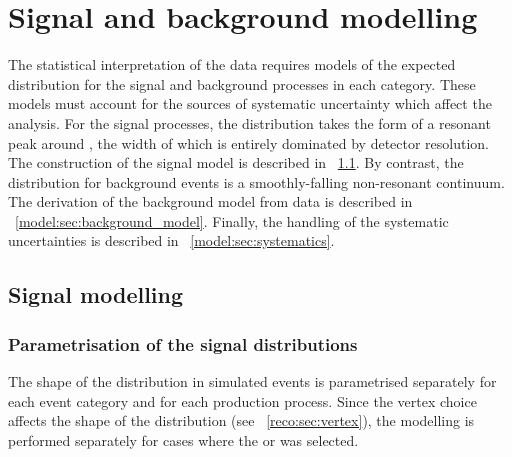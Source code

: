 \chapter{Signal and background modelling}
\label{chap:model}

The statistical interpretation of the data requires models of the expected \mgg distribution for the signal and background processes in each category. These models must account for the sources of systematic uncertainty which affect the analysis. %
For the signal processes, the \mgg distribution takes the form of a resonant peak around \mH, the width of which is entirely dominated by detector resolution. The construction of the signal model is described in \Sec~\ref{model:sec:signal_model}. By contrast, the \mgg distribution for background events is a smoothly-falling non-resonant continuum. The derivation of the background model from data is described in \Sec~\ref{model:sec:background_model}. Finally, the handling of the systematic uncertainties is described in \Sec~\ref{model:sec:systematics}. 

\section{Signal modelling}
\label{model:sec:signal_model}

\subsection{Parametrisation of the signal \mgg distributions}

The shape of the \mgg distribution in simulated \Hgg events is parametrised separately for each event category and for each production process. %
Since the vertex choice affects the shape of the \mgg  distribution (see \Sec~\ref{reco:sec:vertex}), the modelling is performed separately for cases where the \RV or \WV  was selected. 

